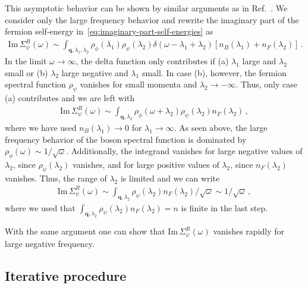 This asymptotic behavior can be shown by similar arguments as in Ref.~\cite{Schneider2009}. We consider only the large frequency behavior and rewrite the imaginary part of the fermion self-energy in~\eqref{eq:imaginary-part-self-energies} as
%
\begin{align}
	\mathrm{Im}\,\Sigma^R_{\psi}(\omega) \sim \int_{\bm{q},\lambda_1,\lambda_2}
	\rho_{\phi}(\lambda_1) \rho_{\psi}(\lambda_2)
	\delta(\omega-\lambda_1+\lambda_2) \left[n_B(\lambda_1)+n_F(\lambda_2)\right] \,.
\end{align}
%
In the limit $\omega\rightarrow\infty$, the delta function only contributes if (a) $\lambda_1$ large and $\lambda_2$ small or (b) $\lambda_2$ large negative and $\lambda_1$ small. In case (b), however, the fermion spectral function $\rho_{\psi}$ vanishes for small momenta and $\lambda_2\rightarrow-\infty$. Thus, only case (a) contributes and we are left with
%
\begin{align}
\mathrm{Im}\,\Sigma^R_{\psi}(\omega) \sim \int_{\bm{q},\lambda_2} \rho_{\phi}(\omega+\lambda_2) \rho_{\psi}(\lambda_2) n_F(\lambda_2) \,,
\end{align}
%
where we have used $n_B(\lambda_1)\rightarrow 0$ for $\lambda_1\rightarrow\infty$. As seen above, the large frequency behavior of the boson spectral function is dominated by $\rho_{\phi}(\omega)\sim 1/\sqrt{\omega}$. Additionally, the integrand vanishes for large negative values of $\lambda_2$, since $\rho_{\psi}(\lambda_2)$ vanishes, and for large positive values of $\lambda_2$, since $n_F(\lambda_2)$ vanishes. Thus, the range of $\lambda_2$ is limited and we can write
%
\begin{align}
\mathrm{Im}\,\Sigma^R_{\psi}(\omega) \sim \int_{\bm{q},\lambda_2} \rho_{\psi}(\lambda_2) n_F(\lambda_2) / \sqrt{\omega} \sim 1/\sqrt{\omega} \,,
\end{align}
%
where we used that $\int_{\bm{q},\lambda_2} \rho_{\psi}(\lambda_2) n_F(\lambda_2) = n$ is finite in the last step.


With the same argument one can show that $\mathrm{Im}\,\Sigma^R_{\psi}(\omega)$ vanishes rapidly for large negative frequency. 



\subsection*{Iterative procedure}
\label{subsec:iteration}

